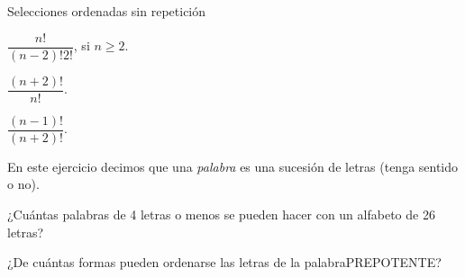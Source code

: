 \begin{section}{Selecciones ordenadas sin repetición}
\begin{enumex}
\begin{enumex}
        \begin{minipage}{0.45\textwidth}
            \item $\dfrac{n!}{(n-2)! 2!} $, \; si $n \geq 2$.
        \end{minipage}
        \begin{minipage}{0.40\textwidth}
            \item $\dfrac{(n + 2)!}{n!}$.
        \end{minipage}
        
        \begin{minipage}{0.40\textwidth}
            \item $\dfrac{(n-1)!}{(n + 2)!}$.
        \end{minipage}
    \end{enumex}       
    
    \item
        En este ejercicio decimos que una \textit{palabra} es una sucesión de letras (tenga sentido o no).
        \begin{enumex}
            \item ¿Cuántas palabras de 4 letras o  menos se pueden hacer con un alfabeto de 26 letras?
            \item ¿De cuántas formas pueden ordenarse las letras de la palabra\newline PREPOTENTE?
        \end{enumex}
\end{enumex}

\end{section}

